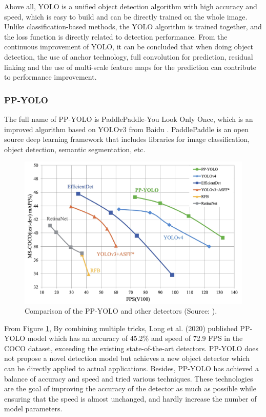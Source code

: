 \documentclass[journal,article,submit,moreauthors,pdftex]{Definitions/mdpi}
\begin{document}
Above all, YOLO is a unified object detection algorithm with high accuracy and speed, which is easy to build and can be directly trained on the whole image. Unlike classification-based methods, the YOLO algorithm is trained together, and the loss function is directly related to detection performance. From the continuous improvement of YOLO, it can be concluded that when doing object detection, the use of anchor technology, full convolution for prediction, residual linking and the use of multi-scale feature maps for the prediction can contribute to performance improvement.


\subsubsection{PP-YOLO}
The full name of PP-YOLO is PaddlePaddle-You Look Only Once, which is an improved algorithm based on YOLOv3 from Baidu \cite{long2020pp}. PaddlePaddle is an open source deep learning framework that includes libraries for image classification, object detection, semantic segmentation, etc.

\begin{figure}[htbp]
\centering
\includegraphics[width=1\columnwidth]{images/PP-YOLO.jpeg}
\caption{Comparison of the PP-YOLO and other detectors (Source: \cite{long2020pp}).}
\label{fig:pp-yolo}
\end{figure}

From Figure \ref{fig:pp-yolo}, By combining multiple tricks, Long et al. (2020) published PP-YOLO model which has an accuracy of 45.2\% and speed of 72.9 FPS in the COCO dataset, exceeding the existing state-of-the-art detectors. 
PP-YOLO does not propose a novel detection model but achieves a new object detector which can be directly applied to actual applications. Besides, PP-YOLO has achieved a balance of accuracy and speed and tried various techniques. These technologies are the goal of improving the accuracy of the detector as much as possible while ensuring that the speed is almost unchanged, and hardly increase the number of model parameters.
\end{document}
